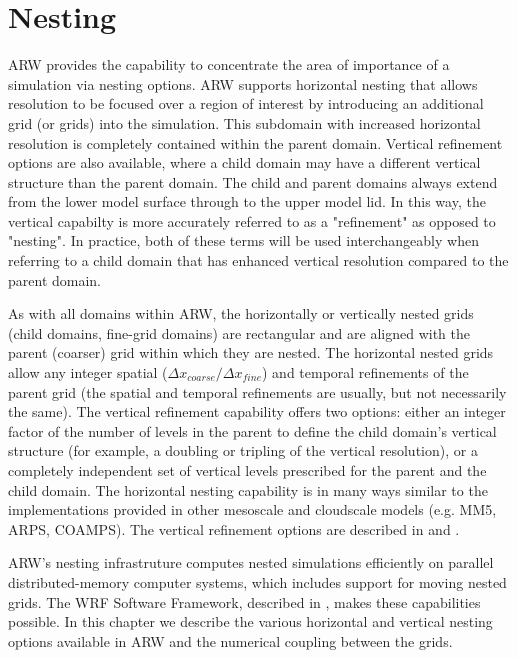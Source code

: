 \chapter{Nesting}
\label{nesting_chap}

ARW provides the capability to concentrate the area of importance of a simulation
via nesting options. 
ARW supports horizontal nesting that allows resolution to be
focused over a region of interest by introducing an additional grid (or
grids) into the simulation.  This subdomain with increased horizontal resolution is completely
contained within the parent domain. Vertical refinement options are also 
available, where a child domain may have a different vertical structure than
the parent domain. The child and parent domains always extend from the lower model surface
through to the upper model lid. In this way, the vertical capabilty is more accurately referred
to as a "refinement" as opposed to "nesting". In practice, both of these terms will be used 
interchangeably when referring to a child domain that has enhanced vertical resolution 
compared to the parent domain.

As with all domains within ARW, the horizontally or vertically nested grids (child domains, 
fine-grid domains) are rectangular
and are aligned with the parent (coarser) grid within which they are
nested.  
The horizontal nested grids allow any integer spatial
($\Delta x_{coarse}/\Delta x_{fine}$) 
and temporal refinements of the
parent grid (the spatial and temporal refinements are usually,
but not necessarily the same).  
The vertical refinement capability offers two options: either an integer factor of the
number of levels in the parent to define the child domain's vertical structure (for example, 
a doubling or tripling of the vertical resolution), or a completely independent set of 
vertical levels prescribed for the parent and the child domain.
The horizontal nesting capability is in many ways similar to the
implementations provided in other mesoscale and cloudscale models (e.g. MM5,
ARPS, COAMPS). The vertical refinement options are described in 
\citet{mahalovmoustaoui09} and \citet{daniels16}.

ARW's nesting
infrastruture computes nested
simulations efficiently on parallel distributed-memory computer systems,
which includes support for moving nested grids.
The WRF Software Framework, described in
\citet{michalak04}, makes these capabilities possible.  In this chapter we
describe the various horizontal and vertical nesting options available in ARW and the 
numerical coupling between the grids.

